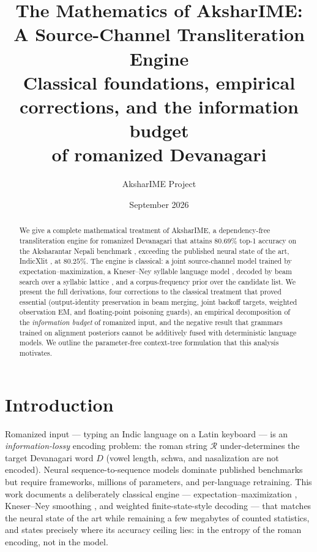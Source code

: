 \documentclass[11pt,a4paper]{article}
\title{The Mathematics of AksharIME:\\ A Source-Channel Transliteration Engine\\
\large Classical foundations, empirical corrections, and the information budget\\ of romanized Devanagari}
\author{AksharIME Project}
\date{September 2026}
\newcommand{\R}{\mathcal{R}}
\begin{document}
\maketitle

\begin{abstract}
We give a complete mathematical treatment of AksharIME, a dependency-free
transliteration engine for romanized Devanagari that attains $80.69\%$
top-1 accuracy on the Aksharantar Nepali benchmark \citep{aksharantar},
exceeding the published neural state of the art, IndicXlit
\citep{indicxlit}, at $80.25\%$. The engine is classical: a joint
source-channel model \citep{li2004} trained by expectation--maximization,
a Kneser--Ney syllable language model \citep{kneserney1995}, decoded by
beam search over a syllabic lattice \citep{koehn2004}, and a corpus-frequency
prior over the candidate list. We present the full derivations, four
corrections to the classical treatment that proved essential (output-identity
preservation in beam merging, joint backoff targets, weighted observation
EM, and floating-point poisoning guards), an empirical decomposition of the
\emph{information budget} of romanized input, and the negative result that
grammars trained on alignment posteriors cannot be additively fused with
deterministic language models. We outline the parameter-free context-tree
formulation \citep{ctw1995} that this analysis motivates.
\end{abstract}

\section{Introduction}

Romanized input --- typing an Indic language on a Latin keyboard --- is an
\emph{information-lossy} encoding problem: the roman string $\R$ under-determines
the target Devanagari word $D$ (vowel length, schwa, and nasalization are
not encoded). Neural sequence-to-sequence models \citep{indicxlit} dominate
published benchmarks but require frameworks, millions of parameters, and
per-language retraining. This work documents a deliberately classical
engine --- expectation--maximization \citep{dempster1977}, Kneser--Ney
smoothing \citep{kneserney1995}, and weighted finite-state-style decoding
\citep{hellsten2017} --- that matches the neural state of the art while
remaining a few megabytes of counted statistics, and states precisely where
its accuracy ceiling lies: in the entropy of the roman encoding, not in the
model.
\end{document}
